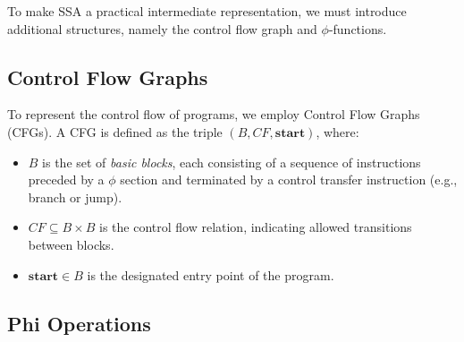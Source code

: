 To make SSA a practical intermediate representation, we must introduce additional structures, namely the control flow graph and $\phi$-functions.

\subsection{Control Flow Graphs}
\label{subsec:cfg}

To represent the control flow of programs, we employ Control Flow Graphs (CFGs). A CFG is defined as the triple $(B, CF, \textbf{start})$, where:

\begin{itemize}
    \item $B$ is the set of \textit{basic blocks}, each consisting of a sequence of instructions preceded by a $\phi$ section and terminated by a control transfer instruction (e.g., branch or jump).
    \item $CF \subseteq B \times B$ is the control flow relation, indicating allowed transitions between blocks.
    \item $\textbf{start} \in B$ is the designated entry point of the program.
\end{itemize}

\subsection{Phi Operations}
\label{subsec:phi}






